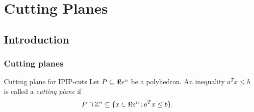 

%
%
%
%
%
%
%
%
%
%

\chapter{Cutting Planes}
\section{Introduction}

\subsection{Cutting planes}
\begin{definition}{Cutting plane for IP}{IP-cuts} Let $P\subseteq\Re e^n$ be a polyhedron. An inequality $a^Tx\leq b$ is called a \emph{cutting plane }if 
$$P\cap{\mathbb{Z}}^n\subseteq \{x\in\Re e^n{\,:\,} a^Tx\leq b\}.$$
\end{definition}

